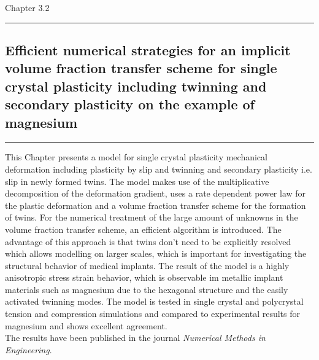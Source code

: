 \newpage
% 


\newpage
\Large {Chapter 3.2}
\normalsize
\vspace{0.3cm}
\hrule
\subsection*{\Large \centering Efficient numerical strategies for an implicit
volume fraction transfer scheme for single \\ crystal plasticity including twinning and secondary plasticity on the example of magnesium}
\hrule
\vspace{1.5cm}

This Chapter presents a model for single crystal plasticity mechanical deformation including plasticity by slip and twinning and secondary plasticity i.e. slip in newly formed twins. The model makes use of the multiplicative decomposition of the deformation gradient, uses a rate dependent power law for the plastic deformation and a volume fraction transfer scheme for the formation of twins. For the numerical treatment of the large amount of unknowns in the volume fraction transfer scheme, an efficient algorithm is introduced. The advantage of this approach is that twins don't need to be explicitly resolved which allows modelling on larger scales, which is important for investigating the structural behavior of medical implants. The result of the model is a highly anisotropic stress strain behavior, which is observable im metallic implant materials such as magnesium due to the hexagonal structure and the easily activated twinning modes. The model is tested in single crystal and polycrystal tension and compression simulations and compared to experimental results for magnesium and shows excellent agreement. \\

The results have been published in the journal \textit{Numerical Methods in Engineering}. \\

